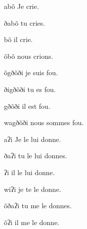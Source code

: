 \documentclass{article}
\begin{document}
\begin{multicols}{3}
\begin{exe}
\ex \label{ex:aboN}
\glt abõ 
\glt Je crie.
\end{exe} 

\begin{exe}
\ex 
\glt ðabõ 
\glt tu cries.
\end{exe} 
 
 \begin{exe}
\ex 
\glt bõ 
\glt il crie.
\end{exe} 
 
  \begin{exe}
\ex 
\glt õbõ 
\glt nous crions.
\end{exe} 

  \begin{exe}
\ex 
\glt õgðõði
\glt je suis fou.
\end{exe} 

  \begin{exe}
\ex 
\glt ðigðõði
\glt tu es fou.
\end{exe} 

  \begin{exe}
\ex 
\glt gðõði
\glt il est fou.
\end{exe} 

  \begin{exe}
\ex 
\glt wagðõði
\glt nous sommes fou.
\end{exe} 

\begin{exe}
\ex 
\glt aʔi
\glt Je le lui donne.
\end{exe} 

\begin{exe}
\ex 
\glt ðaʔi
\glt tu le lui donnes.
\end{exe} 
 
 \begin{exe}
\ex 
\glt ʔi
\glt il le lui donne.
\end{exe} 

 \begin{exe}
\ex 
\glt wiʔi
\glt je te le donne.
\end{exe} 

 \begin{exe}
\ex 
\glt õðaʔi
\glt tu me le donnes.
\end{exe} 

 \begin{exe}
\ex 
\glt õʔi
\glt il me le donne.
\end{exe} 


\end{multicols}
\end{document}
